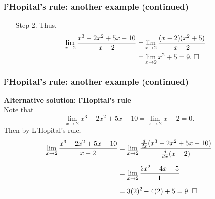\documentclass{beamer}
\begin{document}


\begin{frame}
\frametitle{l'Hopital's rule: another example (continued)}

\begin{enumerate}
\item[Step 2. ] Thus,
\begin{align*}
\lim_{x\rightarrow 2} \frac{ x^3 - 2x^2 + 5x - 10 }{ x-2 } &= \lim_{x\rightarrow 2} \frac{ (x-2)(x^2 + 5)}{ x-2 } \\
&=  \lim_{x\rightarrow 2} x^2 + 5 = 9. \thickspace \Box
\end{align*}
\end{enumerate}	


\end{frame}


\begin{frame}
\frametitle{l'Hopital's rule: another example (continued)}

 {\bf Alternative solution: l'Hopital's rule}\\[2mm]
 Note that 
 \[
 \lim_{x\rightarrow 2}{ x^3 - 2x^2 + 5x - 10 } =  \lim_{x\rightarrow 2} x -2 = 0.
 \]
 Then by L'Hopital's rule,
 \begin{align*}
 \lim_{x\rightarrow 2} \frac{ x^3 - 2x^2 + 5x - 10 }{ x-2 } &= \lim_{x\rightarrow 2} \frac{ \frac{d}{dx} ( x^3 - 2x^2 + 5x - 10 )}{\frac{d}{dx} (x-2) }\\[2mm]
 &=  \lim_{x\rightarrow 2} \frac{ 3x^2 -4x +5 }{ 1 }\\[2mm]
 &= 3(2)^2 - 4(2) + 5= 9. \thickspace \Box
 \end{align*}

\end{frame}




\end{document}
